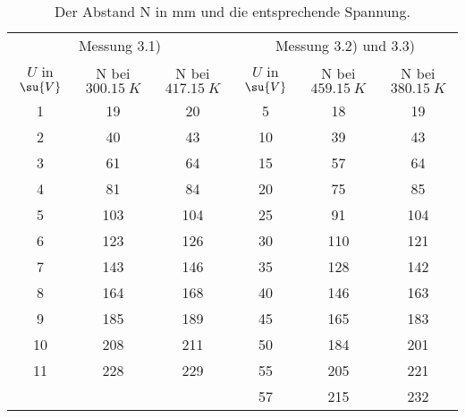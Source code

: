 \begin{table}
  \caption{Der Abstand N in mm und die entsprechende Spannung.}
  \label{tab:Kaestchen}
  \begin{tabular}{c c c | c c c}
    \toprule
    \multicolumn{3}{c}{Messung 3.1)} & \multicolumn{3}{c}{Messung 3.2) und 3.3)} \\
    $U$ in $\su{V}$ & N bei $\SI{300.15}{K}$ & N bei $\SI{417.15}{K}$
    & $U$ in $\su{V}$ & N bei $\SI{459.15}{K}$ & N bei $\SI{380.15}{K}$ \\
    \midrule
    1  &  19 &  20 &  5 &  18 &  19 \\
    2  &  40 &  43 & 10 &  39 &  43 \\
    3  &  61 &  64 & 15 &  57 &  64 \\
    4  &  81 &  84 & 20 &  75 &  85 \\
    5  & 103 & 104 & 25 &  91 & 104 \\
    6  & 123 & 126 & 30 & 110 & 121 \\
    7  & 143 & 146 & 35 & 128 & 142 \\
    8  & 164 & 168 & 40 & 146 & 163 \\
    9  & 185 & 189 & 45 & 165 & 183 \\
    10 & 208 & 211 & 50 & 184 & 201 \\
    11 & 228 & 229 & 55 & 205 & 221 \\
       &     &     & 57 & 215 & 232 \\
    \bottomrule
  \end{tabular}
\end{table}
